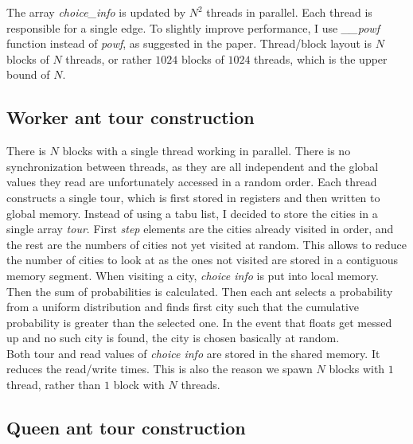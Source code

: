 \documentclass[12pt, a4paper]{article}
\begin{document}
The array \emph{choice\_info} is updated by $N^2$ threads in parallel. Each
thread is responsible for a single edge. To slightly improve performance, I use
\emph{\_\_powf} function instead of \emph{powf}, as suggested in the paper.
Thread/block layout is $N$ blocks of $N$ threads, or rather $1024$ blocks of
$1024$ threads, which is the upper bound of $N$.

\subsection*{Worker ant tour construction}

There is $N$ blocks with a single thread working in parallel. There is no
synchronization between threads, as they are all independent and the global
values they read are unfortunately accessed in a random order. Each thread
constructs a single tour, which is first stored in registers and then written
to global memory. Instead of using a tabu list, I decided to store the cities
in a single array \emph{tour}. First \emph{step} elements are the cities
already visited in order, and the rest are the numbers of cities not yet
visited at random. This allows to reduce the number of cities to look at as the
ones not visited are stored in a contiguous memory segment. When visiting a
city, \emph{choice info} is put into local memory. Then the sum of
probabilities is calculated. Then each ant selects a probability from a uniform
distribution and finds first city such that the cumulative probability is
greater than the selected one. In the event that floats get messed up and no
such city is found, the city is chosen basically at random.\\
Both tour and read values of \emph{choice info} are stored in the shared
memory. It reduces the read/write times. This is also the reason we spawn $N$
blocks with $1$ thread, rather than $1$ block with $N$ threads.

\subsection*{Queen ant tour construction}
\end{document}
